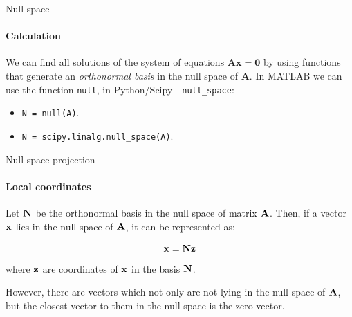 \documentclass{beamer}
\begin{document}
\begin{frame}{Null space}
	\framesubtitle{Calculation}
	\begin{flushleft}
		
		We can find all solutions of the system of equations $\mathbf{A} \mathbf{x} = \mathbf{0}$ by using functions that generate an \emph{orthonormal basis} in the null space of $\mathbf{A}$. In MATLAB we can use the function \texttt{null}, in Python/Scipy - \texttt{null\_space}:
		
		\bigskip
		
		\begin{itemize}
			\item \texttt{N = null(A)}.
			\item \texttt{N = scipy.linalg.null\_space(A)}.
		\end{itemize}
		
		
	\end{flushleft}
\end{frame}



\begin{frame}{Null space projection}
	\framesubtitle{Local coordinates}
	\begin{flushleft}
		
		Let $\mathbf{N}$ be the orthonormal basis in the null space of matrix $\mathbf{A}$. Then, if a vector $\mathbf{x}$ lies in the null space of $\mathbf{A}$, it can be represented as:
		
		\begin{equation}
			\mathbf{x} = \mathbf{N}\mathbf{z}
		\end{equation}
		where $\mathbf{z}$ are coordinates of $\mathbf{x}$ in the basis $\mathbf{N}$.
		
		\bigskip
		
		However, there are vectors which not only are not lying in the null space of $\mathbf{A}$,  but the closest vector to them in the null space is the zero vector.
		
	\end{flushleft}
\end{frame}
\end{document}

